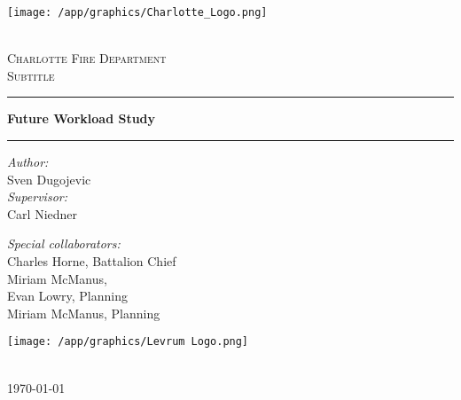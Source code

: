 \begin{titlepage}
    \vspace*{1cm}

    \begin{center}
        \begin{minipage}{0.25\textwidth}
            \centering
            \texttt{[image: /app/graphics/Charlotte\_Logo.png]}
        \end{minipage}
        \\[1.5cm]

        \textsc{\LARGE Charlotte Fire Department}\\[1.5cm]
        \textsc{\Large Subtitle}\\[0.5cm]

        \hrule\vspace{0.4cm}
        { \huge \bfseries Future Workload Study}\\[0.4cm]
        \hrule\vspace{0.4cm}

        \vspace{1.5cm}

        \begin{minipage}{0.45\textwidth}
            \begin{flushleft} \large
                \emph{Author:}\\
                Sven Dugojevic\\
                \vspace{0.5cm}
                \emph{Supervisor:} \\
                Carl Niedner
            \end{flushleft}
        \end{minipage}
        \hfill
        \begin{minipage}{0.45\textwidth}
            \begin{flushright} \large
                \emph{Special collaborators:} \\
                Charles Horne, Battalion Chief\\
                Miriam McManus, \\
                Evan Lowry, Planning\\
                Miriam McManus, Planning
            \end{flushright}
        \end{minipage}

        \vfill

        \begin{minipage}{0.25\textwidth}
            \centering
            \texttt{[image: /app/graphics/Levrum Logo.png]}
        \end{minipage}
        \\[1.5cm]

        {\large \today}
    \end{center}
\end{titlepage}
